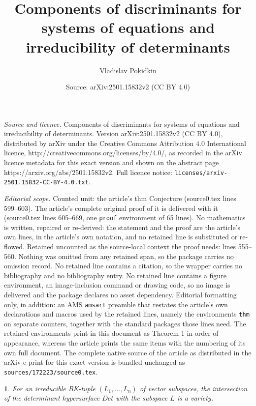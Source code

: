 \documentclass[10pt,a4paper]{amsart}
\title{Components of discriminants for systems of equations and irreducibility of determinants}
\author{Vladislav Pokidkin}
\date{Source: arXiv:2501.15832v2 (CC BY 4.0)}
\newtheorem{thm}{}
\begin{document}
\maketitle

\noindent\emph{Source and licence.} Components of discriminants for systems of equations and irreducibility of determinants. Version arXiv:2501.15832v2 (CC BY 4.0), distributed by arXiv under the Creative Commons Attribution 4.0 International licence, http://creativecommons.org/licenses/by/4.0/, as recorded in the arXiv licence metadata for this exact version and shown on the abstract page https://arxiv.org/abs/2501.15832v2. Full licence notice: \texttt{licenses/arxiv-2501.15832-CC-BY-4.0.txt}.\par\smallskip

\noindent\textit{Editorial scope.} Counted unit: the article's thm Conjecture (source0.tex lines 599--603). The article's complete original proof of it is delivered with it (source0.tex lines 605--669, one \texttt{proof} environment of 65 lines). No mathematics is written, repaired or re-derived: the statement and the proof are the article's own lines, in the article's own notation, and no retained line is substituted or re-flowed.  Retained uncounted as the source-local context the proof needs: lines 555--560.  Nothing was omitted from any retained span, so the package carries no omission record.  No retained line contains a citation, so the wrapper carries no bibliography and no bibliography entry.  No retained line contains a figure environment, an image-inclusion command or drawing code, so no image is delivered and the package declares no asset dependency.  Editorial formatting only, in addition: an AMS \texttt{amsart} preamble that restates the article's own declarations and macros used by the retained lines, namely the environments \texttt{thm} on separate counters, together with the standard packages those lines need.  The retained environments print in this document as Theorem 1 in order of appearance, whereas the article prints the same items with the numbering of its own full document.  The complete native source of the article as distributed in the arXiv e-print for this exact version is bundled unchanged as \texttt{sources/172223/source0.tex}.
\begin{thm}
\label{Theorem. Intersection of the determinant with a subspace}For
an irreducible BK-tuple $(L_{1},...,L_{n})$ of vector subspaces,
the intersection of the determinant hypersurface $Det$ with the subspace
$L$ is a variety.
\end{thm}
\end{document}
